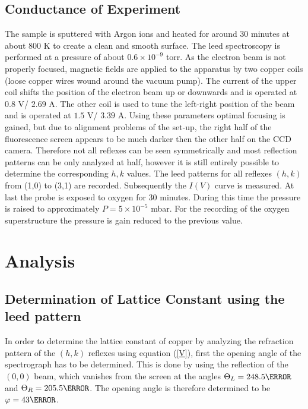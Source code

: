 \documentclass[a4paper]{scrartcl}
\numberwithin{equation}{section}
\numberwithin{figure}{section}
\numberwithin{table}{section}
\newcommand{\Formel}[1]{(\ref{#1})}
\begin{document}
\subsection{Conductance of Experiment}
The sample is sputtered with Argon ions and heated for around 30 minutes at about 800 K to create a clean and smooth surface. The leed spectroscopy is performed at a pressure of about $0.6 \times 10^{-9}$ torr. As the electron beam is not properly focused, magnetic fields are applied to the apparatus by two copper coils (loose copper wires wound around the vacuum pump). The current of the upper coil shifts the position of the electron beam up or downwards and is operated at $0.8$ V/ $2.69$ A. The other coil is used to tune the left-right position of the beam and is operated at $1.5$ V/ $3.39$ A. Using these parameters optimal focusing is gained, but due to alignment problems of the set-up, the right half of the fluorescence screen appears to be much darker then the other half on the CCD camera. Therefore not all reflexes can be seen symmetrically and most reflection patterns can be only analyzed at half, however it is still entirely possible to determine the corresponding $h,k$ values. The leed patterns for all reflexes $(h,k)$ from (1,0) to (3,1) are recorded. Subsequently the $I(V)$ curve is measured. At last the probe is exposed to oxygen for 30 minutes. During this time the pressure is raised to approximately $P=5 \times 10^{-5}$ mbar. For the recording of the oxygen superstructure the pressure is gain reduced to the previous value.

\clearpage
\section{Analysis}
\subsection{Determination of Lattice Constant using the leed pattern}
In order to determine the lattice constant of copper by analyzing the refraction pattern of the $(h,k)$ reflexes using equation \Formel{V}, first the opening angle of the spectrograph has to be determined. This is done by using the reflection of the $(0,0)$ beam, which vanishes from the screen at the angles $\Theta_L = 248.5 \degree$ and $\Theta_R=205.5 \degree$. The opening angle is therefore determined to be $\varphi=43 \degree$. 
\end{document}
